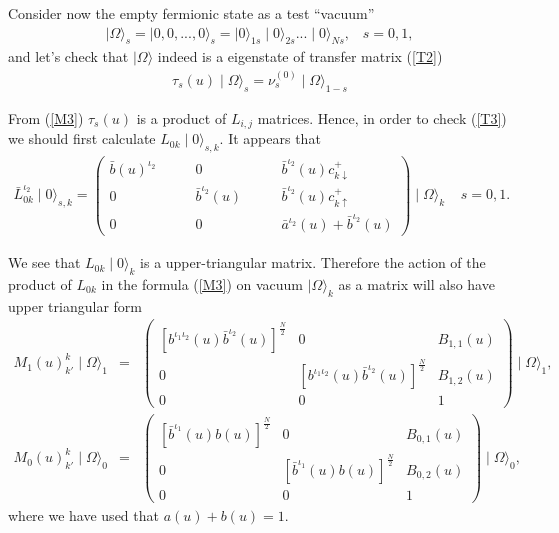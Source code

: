 \documentclass[a4paper,12pt]{article}
\newcommand{\nn}{\nonumber}
\begin{document}
Consider now the empty fermionic state as a test ``vacuum''
\begin{eqnarray}
\label{O}
\mid{\Omega}\rangle_{s}=\mid{0,0,...,0}\rangle_{s}=\mid{0}\rangle_{1s}
\mid{0}\rangle_{2s}...\mid{0}\rangle_{Ns},\;\;\;s=0,1,
\end{eqnarray}
and let's check that $\mid{\Omega}\rangle$ indeed is a eigenstate
of transfer matrix (\ref{T2})
\begin{eqnarray}
\label{T3}
\tau_{s}(u)\mid{\Omega}\rangle_{s}=\nu_{s}^{(0)}\mid{\Omega}\rangle_{1-s}
\end{eqnarray}

{}From (\ref{M3}) ${\tau_{s}(u)}$ is a product
of $L_{i,j}$ matrices. Hence, in order to check (\ref{T3}) we should
first calculate $L_{0k}\mid{0}\rangle_{s,k}$. It appears that 
\begin{eqnarray}
\label{L3}
\bar{L}_{0k}^{\iota_2}\mid{0}\rangle_{s,k}=\left(
\begin{array}{lll}
\bar{b}(u)^{\iota_2}\qquad &0\qquad &\bar{b}^{\iota_2}(u)c_{k\downarrow}^{+}\\
0\qquad &\bar{b}^{\iota_2}(u)\qquad &\bar{b}^{\iota_2}(u)c_{k\uparrow}^{+}\\
0\qquad &0\qquad &\bar{a}^{\iota_2}(u)+\bar{b}^{\iota_2}(u)
\end{array}
\right)\mid{\Omega}\rangle_{k}\;\;\;\;
s=0,1.
\end{eqnarray}

We see that $L_{0k}\mid{0}\rangle_{k}$ is a upper-triangular 
matrix. Therefore the action of the product of $L_{0k}$ in the 
formula (\ref{M3}) on vacuum $\mid{\Omega}\rangle_{k}$ as a matrix 
will also have upper triangular form
\begin{eqnarray}
\label{M6}
M_{1}(u)_{k'}^{k}\mid{\Omega}\rangle_{1}&=&\left(
\begin{array}{lll}
[b^{{\iota_1}{\iota_2}}(u)\bar{b}^{\iota_2}(u)]^{\frac{N}{2}} &0 
&B_{1,1}(u)\\
0  & [b^{{\iota_1}{\iota_2}}(u)\bar{b}^{\iota_2}(u)]^{\frac{N}{2}} & B_{1,2}(u)\\
0 & 0 & 1
\end{array}
\right)\mid{\Omega}\rangle_{1},\;\;\;\nn\\
M_{0}(u)_{k'}^{k}\mid{\Omega}\rangle_{0}&=&\left(
\begin{array}{lll}
[\bar{b}^{\iota_1}(u){b}(u)]^{\frac{N}{2}} & 0 
&B_{0,1}(u)\\
0 & [\bar{b}^{\iota_1}(u){b}(u)]^{\frac{N}{2}} & B_{0,2}(u)\\
0 &0 & 1
\end{array}
\right)\mid{\Omega}\rangle_{0},\;\;\;
\end{eqnarray}
where we have used that $a(u)+b(u)=1$.
\end{document}
